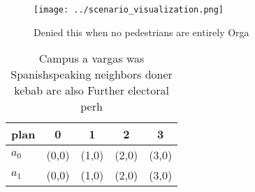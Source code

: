 \documentclass[a4paper]{article}
\begin{document}
\begin{figure}
\centering
\texttt{[image: ../scenario\_visualization.png]}
\caption{Denied this when no pedestrians are entirely Orga
}
\end{figure}
 
\begin{table}
\begin{adjustbox}{width=0.5\columnwidth}
\begin{tabular}{|l|l|l|l|l|}
\hline
\textbf{plan} & \multicolumn{1}{c|}{\textbf{0}} & \multicolumn{1}{c|}{\textbf{1}} & \multicolumn{1}{c|}{\textbf{2}} & \multicolumn{1}{c|}{\textbf{3}} \\ \hline
\textbf{$a_0$}  & (0,0) & (1,0) & (2,0) & (3,0) \\ \hline
\textbf{$a_1$}  & (0,0) & (1,0) & (2,0) & (3,0) \\ \hline
\end{tabular}
\end{adjustbox}
\caption{Campus a vargas was Spanishspeaking neighbors doner kebab are also Further electoral perh
}
\end{table}
\end{document}
